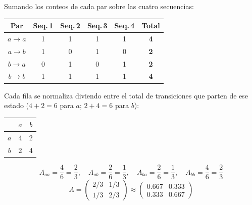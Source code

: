 \noindent
Sumando los conteos de cada par sobre las cuatro secuencias:

\begin{center}
  \begin{tabular}{|c|c|c|c|c|c|}
    \hline
    Par & Seq.\,1 & Seq.\,2 & Seq.\,3 & Seq.\,4 & \textbf{Total} \\
    \hline
    $a \to a$ & 1 & 1 & 1 & 1 & \textbf{4} \\
    $a \to b$ & 1 & 0 & 1 & 0 & \textbf{2} \\
    $b \to a$ & 0 & 1 & 0 & 1 & \textbf{2} \\
    $b \to b$ & 1 & 1 & 1 & 1 & \textbf{4} \\
    \hline
  \end{tabular}
\end{center}

\noindent
Cada fila se normaliza diviendo entre el total de transiciones que parten
de ese estado ($4+2=6$ para $a$; $2+4=6$ para $b$):

\begin{center}
  \begin{tabular}{|c|c|c|}
    \hline
    & $a$ & $b$ \\
    \hline
    $a$ & 4 & 2\\
    $b$ & 2 & 4 \\
    \hline
  \end{tabular}
\end{center}

\[
A_{aa} = \frac{4}{6} = \frac{2}{3}, \quad
A_{ab} = \frac{2}{6} = \frac{1}{3}, \quad
A_{ba} = \frac{2}{6} = \frac{1}{3}, \quad
A_{bb} = \frac{4}{6} = \frac{2}{3}
\]
\[
A = \begin{pmatrix} 2/3 & 1/3 \\ 1/3 & 2/3 \end{pmatrix}
\approx
\begin{pmatrix} 0.667 & 0.333 \\ 0.333 & 0.667 \end{pmatrix}
\]

\bigskip

